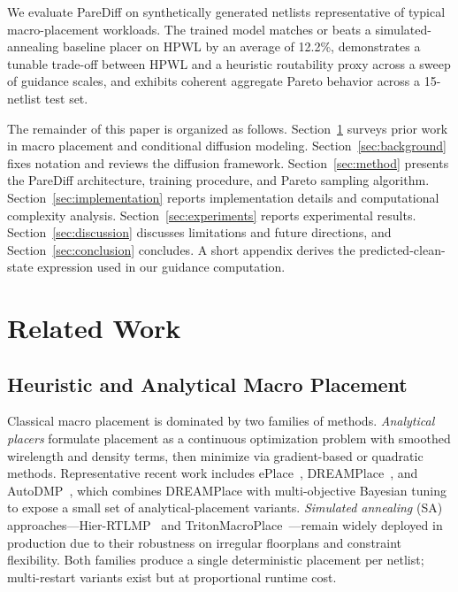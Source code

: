 \documentclass[lettersize,journal]{IEEEtran}
\begin{document}
We evaluate PareDiff on synthetically generated netlists representative of typical macro-placement workloads. The trained model matches or beats a simulated-annealing baseline placer on HPWL by an average of 12.2\%, demonstrates a tunable trade-off between HPWL and a heuristic routability proxy across a sweep of guidance scales, and exhibits coherent aggregate Pareto behavior across a 15-netlist test set.

The remainder of this paper is organized as follows. Section~\ref{sec:related} surveys prior work in macro placement and conditional diffusion modeling. Section~\ref{sec:background} fixes notation and reviews the diffusion framework. Section~\ref{sec:method} presents the PareDiff architecture, training procedure, and Pareto sampling algorithm. Section~\ref{sec:implementation} reports implementation details and computational complexity analysis. Section~\ref{sec:experiments} reports experimental results. Section~\ref{sec:discussion} discusses limitations and future directions, and Section~\ref{sec:conclusion} concludes. A short appendix derives the predicted-clean-state expression used in our guidance computation.

\section{Related Work}
\label{sec:related}

\subsection{Heuristic and Analytical Macro Placement}

Classical macro placement is dominated by two families of methods. \emph{Analytical placers} formulate placement as a continuous optimization problem with smoothed wirelength and density terms, then minimize via gradient-based or quadratic methods. Representative recent work includes ePlace~\cite{lu2015eplace}, DREAMPlace~\cite{lin2019dreamplace}, and AutoDMP~\cite{autodmp}, which combines DREAMPlace with multi-objective Bayesian tuning to expose a small set of analytical-placement variants. \emph{Simulated annealing} (SA) approaches---Hier-RTLMP~\cite{hierrtlmp} and TritonMacroPlace~\cite{tritonmacroplace}---remain widely deployed in production due to their robustness on irregular floorplans and constraint flexibility. Both families produce a single deterministic placement per netlist; multi-restart variants exist but at proportional runtime cost.
\end{document}
